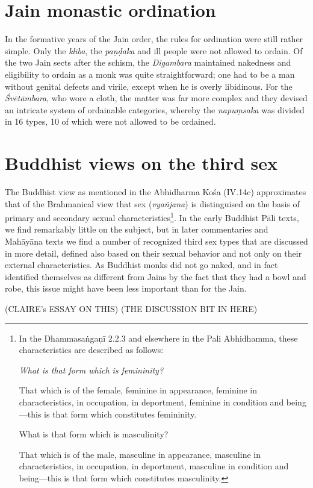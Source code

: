 \section{Jain monastic ordination}
In the formative years of the Jain order, the rules for ordination were still rather simple. Only the {\em klība}, the {\em paṇḍaka} and ill people were not allowed to ordain. Of the two Jain sects after the schism, the {\em Digambara} maintained nakedness and eligibility to ordain as a monk was quite straightforward; one had to be a man without genital defects and virile, except when he is overly libidinous. For the {\em Śvētāmbara}, who wore a cloth, the matter was far more complex and they devised an intricate system of ordainable categories, whereby the {\em napuṃsaka} was divided in 16 types, 10 of which were not allowed to be ordained. 




\section{Buddhist views on the third sex}
The Buddhist view as mentioned in the Abhidharma Kośa (IV.14c) approximates that of the Brahmanical view that sex ({\em vyañjana}) is distinguised on the basis of primary and secondary sexual characteristics\footnote{In the Dhammasaṅgaṇī 2.2.3 and elsewhere in the Pali Abhidhamma, these characteristics are described as follows: {\em What is that form which is femininity?

That which is of the female, feminine in appearance, feminine in characteristics, in occupation, in deportment, feminine in condition and being—this is that form which constitutes femininity.

What is that form which is masculinity?

That which is of the male, masculine in appearance, masculine in characteristics, in occupation, in deportment, masculine in condition and being—this is that form which constitutes masculinity.}}. In the early Buddhist Pāli texts, we find remarkably little on the subject, but in later commentaries and Mahāyāna texts we find a number of recognized third sex types that are discussed in more detail, defined also based on their sexual behavior and not only on their external characteristics. As Buddhist monks did not go naked, and in fact identified themselves as different from Jains by the fact that they had a bowl and robe, this issue might have been less important than for the Jain.

(CLAIRE's ESSAY ON THIS)
(THE DISCUSSION BIT IN HERE)